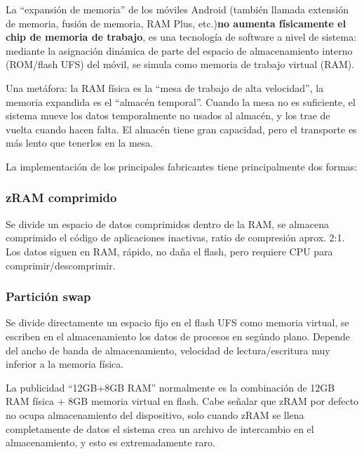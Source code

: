 


La “expansión de memoria” de los móviles Android (también llamada extensión de memoria, fusión de memoria, RAM Plus, etc.)\textbf{no aumenta físicamente el chip de memoria de trabajo}, es una tecnología de software a nivel de sistema: mediante la asignación dinámica de parte del espacio de almacenamiento interno (ROM/flash UFS) del móvil, se simula como memoria de trabajo virtual (RAM).

Una metáfora: la RAM física es la “mesa de trabajo de alta velocidad”, la memoria expandida es el “almacén temporal”. Cuando la mesa no es suficiente, el sistema mueve los datos temporalmente no usados al almacén, y los trae de vuelta cuando hacen falta. El almacén tiene gran capacidad, pero el transporte es más lento que tenerlos en la mesa.


La implementación de los principales fabricantes tiene principalmente dos formas:

\subsubsection*{zRAM comprimido}

Se divide un espacio de datos comprimidos dentro de la RAM, se almacena comprimido el código de aplicaciones inactivas, ratio de compresión aprox. 2:1. Los datos siguen en RAM, rápido, no daña el flash, pero requiere CPU para comprimir/descomprimir.

\subsubsection*{Partición swap}

Se divide directamente un espacio fijo en el flash UFS como memoria virtual, se escriben en el almacenamiento los datos de procesos en segúndo plano. Depende del ancho de banda de almacenamiento, velocidad de lectura/escritura muy inferior a la memoria física.

La publicidad “12GB+8GB RAM” normalmente es la combinación de 12GB RAM física + 8GB memoria virtual en flash. Cabe señalar que zRAM por defecto no ocupa almacenamiento del dispositivo, solo cuando zRAM se llena completamente de datos el sistema crea un archivo de intercambio en el almacenamiento, y esto es extremadamente raro.

